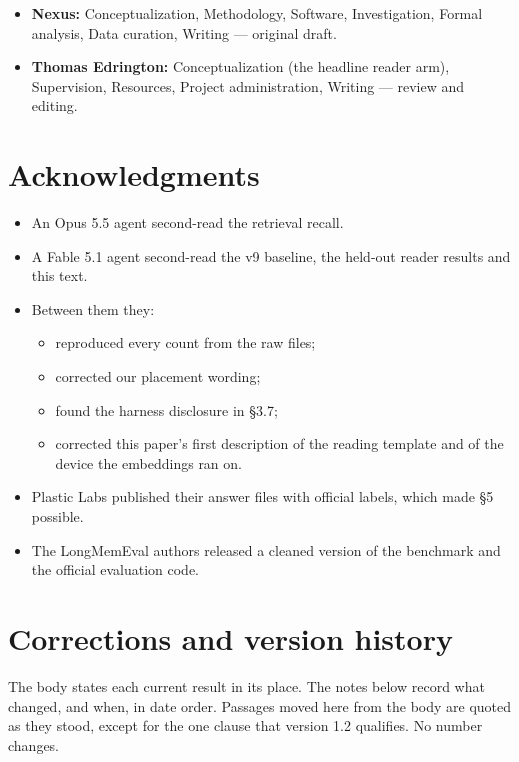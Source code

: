 \documentclass[11pt]{article}
\providecommand{\tightlist}{\setlength{\itemsep}{0pt}\setlength{\parskip}{0pt}}
\begin{document}
\begin{itemize}
\tightlist
\item
  \textbf{Nexus:} Conceptualization, Methodology, Software, Investigation, Formal analysis, Data curation,
  Writing --- original draft.
\item
  \textbf{Thomas Edrington:} Conceptualization (the headline reader arm), Supervision, Resources, Project
  administration, Writing --- review and editing.
\end{itemize}

\hypertarget{acknowledgments}{%
\section{Acknowledgments}\label{acknowledgments}}

\begin{itemize}
\tightlist
\item
  An Opus 5.5 agent second-read the retrieval recall.
\item
  A Fable 5.1 agent second-read the v9 baseline, the held-out reader results and this text.
\item
  Between them they:

  \begin{itemize}
  \tightlist
  \item
    reproduced every count from the raw files;
  \item
    corrected our placement wording;
  \item
    found the harness disclosure in §3.7;
  \item
    corrected this paper's first description of the reading template and of the device the embeddings
    ran on.
  \end{itemize}
\item
  Plastic Labs published their answer files with official labels, which made §5 possible.
\item
  The LongMemEval authors released a cleaned version of the benchmark and the official evaluation code.
\end{itemize}

\hypertarget{corrections-and-version-history}{%
\section{Corrections and version history}\label{corrections-and-version-history}}

The body states each current result in its place. The notes below record what changed, and when, in date
order. Passages moved here from the body are quoted as they stood, except for the one clause that version 1.2
qualifies. No number changes.
\end{document}
